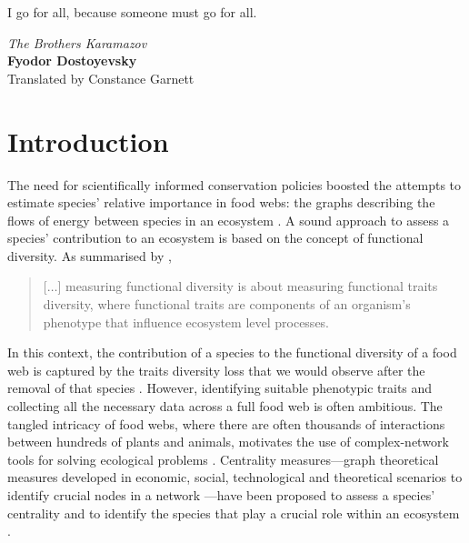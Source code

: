 \documentclass[]{rsos}%
\begin{document}



\maketitle



\epigraph{I go for all, because someone must go for all.}{\emph{The Brothers Karamazov}\\ \textbf{Fyodor Dostoyevsky} \\ Translated by Constance Garnett}


\section{Introduction}\label{sec:intro}

The need for scientifically informed conservation policies boosted the attempts
to estimate species' relative importance in food webs: the graphs describing
the flows of energy between species in an ecosystem \citep{may2009food}. A
sound approach to assess a species' contribution to an ecosystem is based on the
concept of functional diversity. As summarised by \citet*[pg. 742]{petchey2006functional},
\begin{quote}
[$\dots$] measuring functional diversity is about measuring functional traits diversity, where functional traits are components
of an organism's phenotype that influence ecosystem level processes.
\end{quote}
In this context, the contribution of a species to the functional diversity of a food
web is captured by the traits diversity loss that we would observe after the removal
of that species \citep{villeger2008new, fontana2015individual}. However,
identifying suitable phenotypic traits and collecting all the necessary
data across a full food web is often ambitious. The tangled intricacy of food
webs, where there are often thousands of interactions between hundreds of plants and
animals, motivates the use of complex-network tools for solving ecological problems
\citep{proulx2005network}. Centrality measures---graph theoretical measures
developed in economic, social, technological and theoretical scenarios to
identify crucial nodes in a network \citep{newman2009networks}---have been
proposed to assess a species' centrality and to identify the species that play a
crucial role within an ecosystem
\citep{estrada2007characterization,lai2012centrality}.
\end{document}
